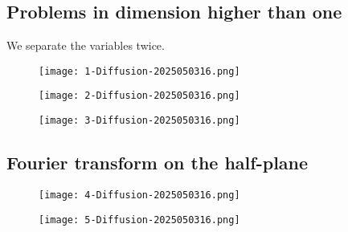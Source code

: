 \subsection{Problems in dimension higher than one}

We separate the variables twice.

\begin{figure}[H]
\centering
\texttt{[image: 1-Diffusion-2025050316.png]}
\label{}
\end{figure}
\begin{figure}[H]
\centering
\texttt{[image: 2-Diffusion-2025050316.png]}
\label{}
\end{figure}
\begin{figure}[H]
\centering
\texttt{[image: 3-Diffusion-2025050316.png]}
\label{}
\end{figure}

\subsection{Fourier transform on the half-plane}

\begin{figure}[H]
\centering
\texttt{[image: 4-Diffusion-2025050316.png]}
\label{}
\end{figure}
\begin{figure}[H]
\centering
\texttt{[image: 5-Diffusion-2025050316.png]}
\label{}
\end{figure}
